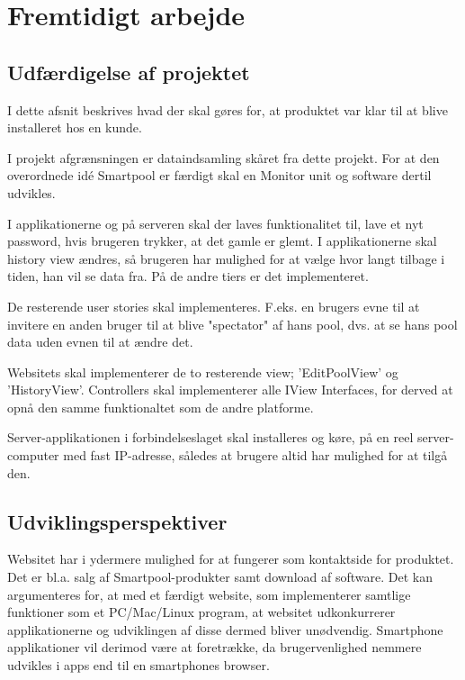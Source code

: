\chapter{Fremtidigt arbejde}
\section{Udfærdigelse af projektet}
I dette afsnit beskrives hvad der skal gøres for, at produktet var klar til at blive installeret hos en kunde.

I projekt afgrænsningen er dataindsamling skåret fra dette projekt. For at den overordnede idé Smartpool er færdigt skal en Monitor unit og software dertil udvikles.

I applikationerne og på serveren skal der laves funktionalitet til, lave et nyt password, hvis brugeren trykker, at det gamle er glemt.
I applikationerne skal history view ændres, så brugeren har mulighed for at vælge hvor langt tilbage i tiden, han vil se data fra. På de andre tiers er det implementeret.

De resterende user stories skal implementeres. F.eks. en brugers evne til at invitere en anden bruger til at blive "spectator" af hans pool, dvs. at se hans pool data uden evnen til at ændre det.

Websitets skal implementerer de to resterende view; 'EditPoolView' og 'HistoryView'. Controllers skal implementerer alle IView Interfaces, for derved at opnå den samme funktionaltet som de andre platforme.   

Server-applikationen i forbindelseslaget skal installeres og køre, på en reel server-computer med fast IP-adresse, således at brugere altid har mulighed for at tilgå den.


\section{Udviklingsperspektiver}
Websitet har i ydermere mulighed for at fungerer som kontaktside for produktet. Det er bl.a. salg af Smartpool-produkter samt download af software. Det kan argumenteres for, at med et færdigt website, som implementerer samtlige funktioner som et PC/Mac/Linux program, at websitet udkonkurrerer applikationerne og udviklingen af disse dermed bliver unødvendig. Smartphone applikationer vil derimod være at foretrække, da brugervenlighed nemmere udvikles i apps end til en smartphones browser.